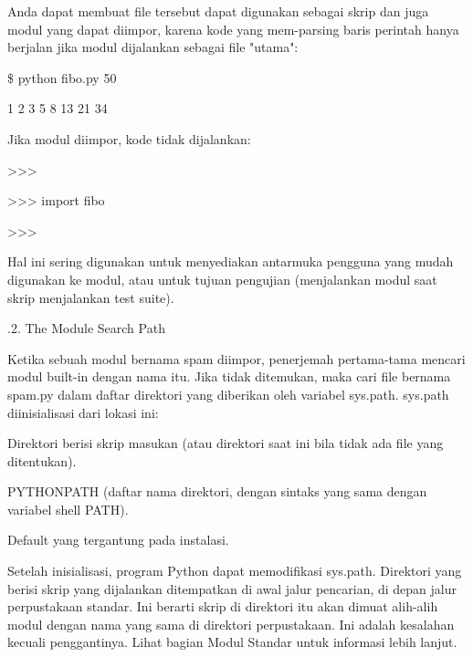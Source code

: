 \noindent 
Anda dapat membuat file tersebut dapat digunakan sebagai skrip dan juga modul yang dapat diimpor, karena kode yang mem-parsing baris perintah hanya berjalan jika modul dijalankan sebagai file "utama": \par
\vspace{12pt}
\noindent 
   \$   python fibo.py 50 \par
{} 1 2 3 5 8 13 21 34 \par
\noindent 
Jika modul diimpor, kode tidak dijalankan: \par
\noindent 
>>> \par
\noindent 
>>> import fibo \par
\noindent 
>>> \par
\noindent 
Hal ini sering digunakan untuk menyediakan antarmuka pengguna yang mudah digunakan ke modul, atau untuk tujuan pengujian (menjalankan modul saat skrip menjalankan test suite). \par
\vspace{12pt}
.2. The Module Search Path \par
\noindent 
Ketika sebuah modul bernama spam diimpor, penerjemah pertama-tama mencari modul built-in dengan nama itu. Jika tidak ditemukan, maka cari file bernama spam.py dalam daftar direktori yang diberikan oleh variabel sys.path. sys.path diinisialisasi dari lokasi ini: \par
\vspace{12pt}
\vspace{12pt}
\vspace{12pt}
\noindent 
  \bullet  Direktori berisi skrip masukan (atau direktori saat ini bila tidak ada file yang ditentukan). \par
\noindent 
  \bullet  PYTHONPATH (daftar nama direktori, dengan sintaks yang sama dengan variabel shell PATH). \par
\noindent 
  \bullet  Default yang tergantung pada instalasi. \par
\vspace{12pt}
\noindent 
Setelah inisialisasi, program Python dapat memodifikasi sys.path. Direktori yang berisi skrip yang dijalankan ditempatkan di awal jalur pencarian, di depan jalur perpustakaan standar. Ini berarti skrip di direktori itu akan dimuat alih-alih modul dengan nama yang sama di direktori perpustakaan. Ini adalah kesalahan kecuali penggantinya. Lihat bagian Modul Standar untuk informasi lebih lanjut. \par
\vspace{12pt}
\vspace{12pt}

